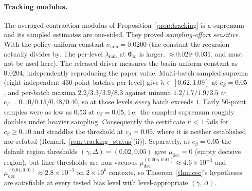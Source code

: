 \documentclass[11pt]{article}
\begin{document}
\paragraph{Tracking modulus.}  The averaged-contraction modulus of
Proposition~\ref{prop:tracking} is a supremum and its sampled
estimates are one-sided. They proved \emph{sampling-effort
sensitive}.  With the policy-uniform constant
$\sigma_{\min}=0.0200$ (the constant the recursion actually divides
by. The per-level $\lambda_{\min}$ at $\bm\theta_\infty$ is larger,
$\approx0.029$--$0.031$, and must not be used here). The released
driver measures the basin-uniform constant as
$0.0204$, independently reproducing the paper value.  Multi-batch
sampled suprema (eight independent $430$-point batches per level) give
$\tilde\kappa\in[0.62,1.09]$ at $c_\beta=0.05$, and per-batch maxima
$2.2/3.3/3.9/8.3$ against minima $1.2/1.7/1.9/3.5$ at
$c_\beta=0.10/0.15/0.18/0.40$, so at those levels \emph{every} batch
exceeds $1$. Early 50-point
samples were as low as $0.53$ at $c_\beta=0.05$, i.e.\ the sampled
supremum roughly doubles under heavier sampling.  Consequently the
certificate $\tilde\kappa<1$ fails for $c_\beta\geq0.10$ and
straddles the threshold at $c_\beta=0.05$, where it is neither
established nor refuted (Remark~\ref{rem:tracking_status}(ii)).
Separately, at $c_\beta=0.05$ the default region thresholds
$(\gamma,\Delta)=(0.02,0.05)$ give $\mu_{\mathrm{dec}}=0$ (empty
decisive region), but finer thresholds are non-vacuous $\mu_{\mathrm{dec}}^{(0.005,0.01)}\approx4.6\times10^{-3}$ and
$\mu_{\mathrm{dec}}^{(0.01,0.01)}\approx2.8\times10^{-3}$ on
$2\times10^6$ contexts, so Theorem~\ref{thm:cec}'s hypotheses are
satisfiable at every tested bias level with level-appropriate
$(\gamma,\Delta)$.
\end{document}
